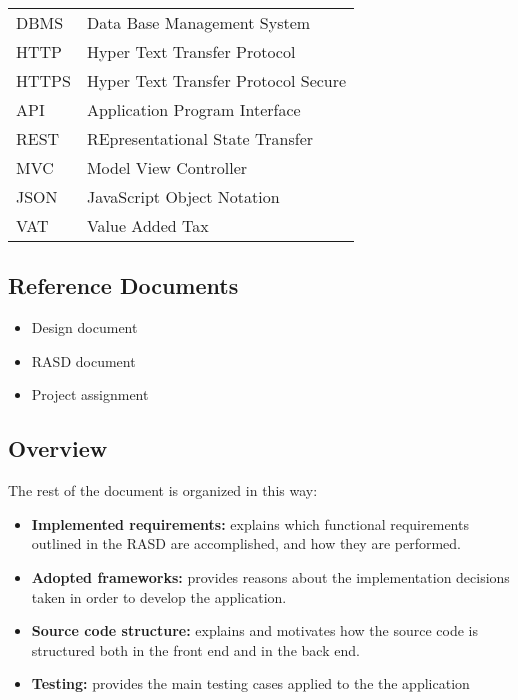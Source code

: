 \begin{center}
	\begin{tabular}{| l | l |}
		\hline
		DBMS & Data Base Management System\\
		HTTP & Hyper Text Transfer Protocol\\
		HTTPS & Hyper Text Transfer Protocol Secure\\
		API & Application Program Interface \\
		REST & REpresentational State Transfer\\
		MVC & Model View Controller\\
		JSON & JavaScript Object Notation \\
		VAT & Value Added Tax\\
		\hline
	\end{tabular}
\end{center}

\subsection{Reference Documents}
\begin{itemize}
	\item Design document
	\item RASD document
	\item Project assignment
\end{itemize}

\subsection{Overview}
The rest of the document is organized in this way:
\begin{itemize}
	
	\item \textbf{Implemented requirements:} explains which functional requirements outlined in the RASD are accomplished, and how they are performed.
	\item \textbf{Adopted frameworks:} provides reasons about the implementation decisions taken in order to develop the application.
	\item \textbf{Source code structure:} explains and motivates how the source code is structured both in the front end and in the back end.
	\item \textbf{Testing:} provides the main testing cases applied to the the application
	
\end{itemize} 
